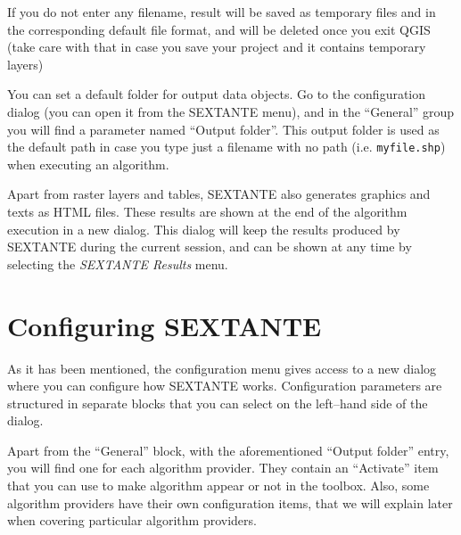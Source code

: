 If you do not enter any filename, result will be saved as temporary files and in the corresponding default file format, and will be deleted once you exit QGIS (take care with that in case you save your project and it contains temporary layers)

You can set a default folder for output data objects. Go to the configuration dialog (you can open it from the SEXTANTE menu), and in the ``General'' group you will find a parameter named ``Output folder''. This output folder is used as the default path in case you type just a filename with no path (i.e. \texttt{myfile.shp}) when executing an algorithm. 

Apart from raster layers and tables, SEXTANTE also generates graphics and texts as HTML files. These results are shown at the end of the algorithm execution in a new dialog. This dialog will keep the results produced by SEXTANTE during the current session, and can be shown at any time by selecting the \emph{SEXTANTE Results} menu.

\section{Configuring SEXTANTE}

As it has been mentioned, the configuration menu gives access to a new dialog where you can configure how SEXTANTE works. Configuration parameters are structured in separate blocks that you can select on the left--hand side of the dialog.

Apart from the ``General'' block, with the aforementioned ``Output folder'' entry, you will find one for each algorithm provider. They contain an ``Activate'' item that you can use to make algorithm appear or not in the toolbox. Also, some algorithm providers have their own configuration items, that we will explain later when covering particular algorithm providers.
